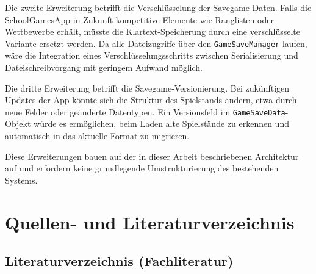 \documentclass[12pt,a4paper]{article}
\begin{document}
Die zweite Erweiterung betrifft die Verschlüsselung der Savegame-Daten. Falls die SchoolGamesApp in Zukunft kompetitive Elemente wie Ranglisten oder Wettbewerbe erhält, müsste die Klartext-Speicherung durch eine verschlüsselte Variante ersetzt werden. Da alle Dateizugriffe über den \texttt{GameSaveManager} laufen, wäre die Integration eines Verschlüsselungsschritts zwischen Serialisierung und Dateischreibvorgang mit geringem Aufwand möglich.

Die dritte Erweiterung betrifft die Savegame-Versionierung. Bei zukünftigen Updates der App könnte sich die Struktur des Spielstands ändern, etwa durch neue Felder oder geänderte Datentypen. Ein Versionsfeld im \texttt{GameSaveData}-Objekt würde es ermöglichen, beim Laden alte Spielstände zu erkennen und automatisch in das aktuelle Format zu migrieren.

Diese Erweiterungen bauen auf der in dieser Arbeit beschriebenen Architektur auf und erfordern keine grundlegende Umstrukturierung des bestehenden Systems.
%
%


\section*{Quellen- und Literaturverzeichnis}

\subsection*{Literaturverzeichnis (Fachliteratur)}
\end{document}
